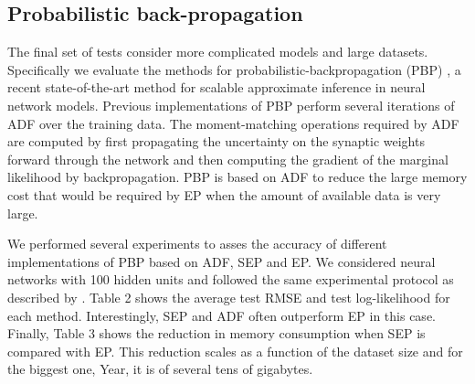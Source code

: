 \subsection{Probabilistic back-propagation}

The final set of tests consider more complicated models and large datasets. Specifically we evaluate the methods for probabilistic-backpropagation (PBP) \cite{hernandez2015probabilistic}, a
recent state-of-the-art method for scalable approximate inference in neural
network models. Previous implementations of PBP perform several iterations of ADF over the training
data.  The moment-matching operations required by ADF are computed by
first propagating the uncertainty on the synaptic weights forward through the network
and then computing the gradient of the marginal likelihood by backpropagation.
PBP is based on ADF to reduce the large memory cost that would be required by EP
when the amount of available data is very large.

We performed several experiments to asses the accuracy of different implementations of PBP
based on ADF, SEP and EP. We considered neural networks with 100 hidden units and followed the same experimental protocol 
as described by \cite{hernandez2015probabilistic}.
Table 2 shows the average test RMSE and test log-likelihood for each method.
Interestingly, SEP and ADF often outperform EP in this case.
Finally, Table 3 shows the reduction in memory consumption when SEP is compared with EP.
This reduction scales as a function of the dataset size and for the biggest
one, Year, it is of several tens of gigabytes.
 
